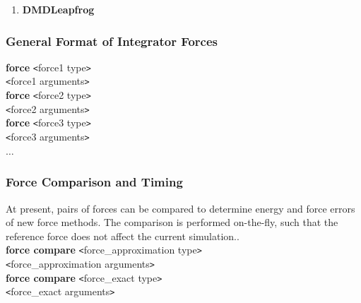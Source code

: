 \documentclass[11pt]{report}
\newcommand{\tempstart}{\texttt{<}}
\newcommand{\tempend}{\texttt{>}}
\begin{document}
\begin{enumerate}
\begin{list}{~}
\end{list}
\item {\bf DMDLeapfrog}
\end{enumerate}



\subsubsection{General Format of Integrator Forces}

{\bf force} \tempstart force1 type\tempend  \\
\indent \tempstart force1 arguments\tempend  \\
{\bf force} \tempstart force2 type\tempend  \\
\indent \tempstart force2 arguments\tempend  \\
{\bf force} \tempstart force3 type\tempend  \\
\indent \tempstart force3 arguments\tempend  \\
$\dots$\\



\subsubsection{Force Comparison and Timing}

At present, pairs of forces  can be compared to determine energy
and force errors of new force methods. The comparison is performed
on-the-fly, such that the reference force does
not affect the current simulation..\\

\noindent
{\bf force compare} \tempstart force\_approximation type\tempend  \\
\indent \tempstart force\_approximation arguments\tempend  \\
{\bf force compare} \tempstart force\_exact type\tempend  \\
\indent \tempstart force\_exact arguments\tempend  \\
\end{document}
